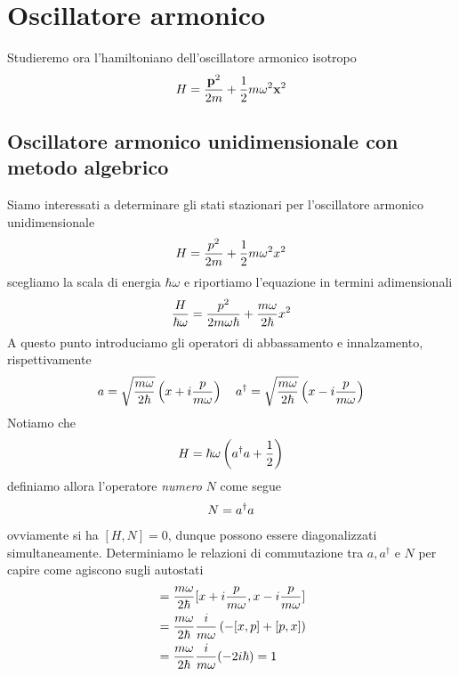 \documentclass{article}
\begin{document}
\newpage
\section{Oscillatore armonico}
Studieremo ora l'hamiltoniano dell'oscillatore armonico isotropo
\begin{gather}
    H = \frac{\mathbf{p}^2}{2m} + \frac{1}{2}m\omega^2\mathbf{x}^2 \notag
\end{gather}
\subsection{Oscillatore armonico unidimensionale con metodo algebrico}
Siamo interessati a determinare gli stati stazionari per l'oscillatore armonico unidimensionale
\begin{gather}
    H = \frac{p^2}{2m} + \frac{1}{2}m\omega^2 x^2 \notag
\end{gather}
scegliamo la scala di energia $\hbar \omega$ e riportiamo l'equazione in termini adimensionali
\begin{gather}
    \frac{H}{\hbar \omega} = \frac{p^2}{2m\omega \hbar} + \frac{m\omega}{2\hbar}x^2 \notag
\end{gather}
A questo punto introduciamo gli operatori di abbassamento e innalzamento, rispettivamente
\begin{gather}
    a = \sqrt{\frac{m\omega}{2\hbar}}\left(x + i\frac{p}{m\omega} \right) \quad a^\dagger = \sqrt{\frac{m\omega}{2\hbar}}\left(x - i\frac{p}{m\omega} \right) \notag
\end{gather}
Notiamo che
\begin{gather}
    H = \hbar\omega \left( a^\dagger a + \frac{1}{2} \right) \notag
\end{gather}
definiamo allora l'operatore \textit{numero} $N$ come segue
\begin{gather}
    N = a^\dagger a \notag
\end{gather}
ovviamente si ha $[H, N] = 0$, dunque possono essere diagonalizzati simultaneamente. Determiniamo le relazioni di commutazione tra $a, a^\dagger$ e $N$ per capire come agiscono sugli autostati
\begin{align}
    [a, a^\dagger] &= \frac{m\omega}{2\hbar}[x + i\frac{p}{m\omega}, x - i\frac{p}{m\omega}] \notag \\
    &= \frac{m\omega}{2\hbar}\frac{i}{m\omega}\left( -[x, p] + [p, x] \right) \notag \\
    &= \frac{m\omega}{2\hbar}\frac{i}{m\omega}(-2i\hbar) = 1 \notag
\end{align}
\end{document}
